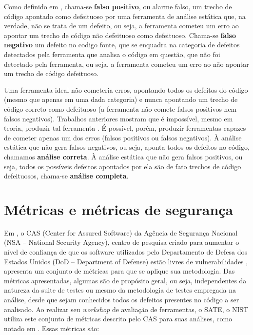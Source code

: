 Como definido em \cite{sa_spec}, chama-se \textbf{falso positivo}, ou alarme falso, um trecho de código apontado como defeituoso por uma ferramenta de análise estática que, na verdade, não se trata de um defeito, ou seja, a ferramenta cometeu um erro ao apontar um trecho de código não defeituoso como defeituoso. Chama-se \textbf{falso negativo} um defeito no codigo fonte, que se enquadra na categoria de defeitos detectados pela ferramenta que analisa o código em questão, que não foi detectado pela ferramenta, ou seja, a ferramenta cometeu um erro ao não apontar um trecho de código defeituoso.

Uma ferramenta ideal não cometeria erros, apontando todos os defeitos do código (mesmo que apenas em uma dada categoria) e nunca apontando um trecho de código correto como defeituoso (a ferramenta não comete falsos positivos nem falsos negativos). Trabalhos anteriores mostram que é impossível, mesmo em teoria, produzir tal ferramenta \cite{sa_spec}. É possível, porém, produzir ferramentas capazes de cometer apenas um dos erros (falsos positivos ou falsos negativos). À análise estática que não gera falsos negativos, ou seja, aponta todos os defeitos no código, chamamos \textbf{análise correta}. À análise estática que não gera falsos positivos, ou seja, todos os possíveis defeitos apontados por ela são de fato trechos de código defeituosos, chama-se \textbf{análise completa}.

\section{Métricas e métricas de segurança}

Em \cite{nsa}, o CAS (Center for Assured Software) da Agência de Segurança Nacional (NSA – National Security Agency), centro de pesquisa criado para aumentar o nível de confiança de que os software utilizados pelo Departamento de Defesa dos Estados Unidos (DoD – Department of Defense) estão livres de vulnerabilidades \cite{nsa}, apresenta um conjunto de métricas para que se aplique sua metodologia. Das métricas apresentadas, algumas são de propósito geral, ou seja, independentes da natureza da suite de testes ou mesmo da metodologia de testes empregada na análise, desde que sejam conhecidos todos os defeitos presentes no código a ser analisado. Ao realizar seu \textit{workshop} de avaliação de ferramentas, o SATE, o NIST utiliza este conjunto de métricas descrito pelo CAS para suas análises, como notado em \cite{sate_iv}. Essas métricas são:

